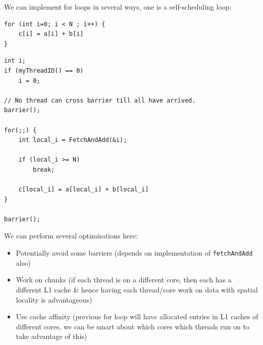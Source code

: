 We can implement for loops in several ways, one is a self-scheduling loop:
\begin{verbatim}
for (int i=0; i < N ; i++) {
    c[i] = a[i] + b[i]
}
\end{verbatim}
\begin{verbatim}
int i;
if (myThreadID() == 0)
    i = 0;

// No thread can cross barrier till all have arrived.
barrier();

for(;;) {
    int local_i = FetchAndAdd(&i);

    if (local_i >= N) 
        break;

    c[local_i] = a[local_i] + b[local_i]
}   

barrier();
\end{verbatim}
We can perform several optimisations here:
\begin{itemize}
    \item Potentially avoid some barriers (depends on implementation of \texttt{fetchAndAdd} also)
    \item Work on chunks (if each thread is on a different core, then each has a different L1 cache \& hence having each thread/core work on data with spatial locality is advantageous)
    \item Use cache affinity (previous for loop will have allocated entries in L1 caches of different cores, we can be smart about which cores which threads run on to take advantage of this)
\end{itemize}

